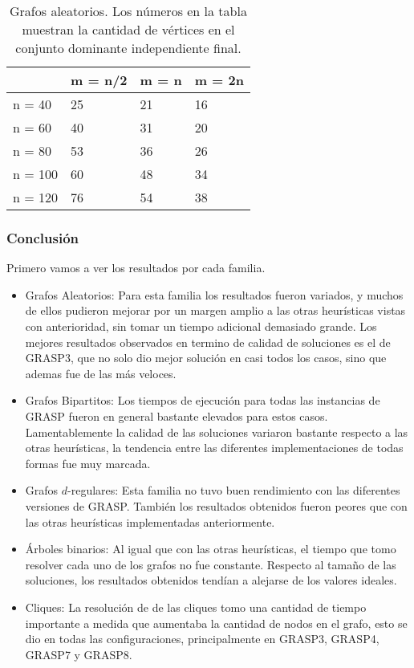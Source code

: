 \begin{table}[H]
\centering
\label{my-label}
\begin{tabular}{|l|lll|}
\hline
        & \multicolumn{1}{l|}{m = n/2} & \multicolumn{1}{l|}{m = n} & m = 2n \\ \hline
n = 40  & 25                           & 21                         & 16     \\ \cline{1-1}
n = 60  & 40                           & 31                         & 20     \\ \cline{1-1}
n = 80  & 53                           & 36                         & 26     \\ \cline{1-1}
n = 100 & 60                           & 48                         & 34     \\ \cline{1-1}
n = 120 & 76                           & 54                         & 38     \\ \hline
\end{tabular}
\caption{Grafos aleatorios. Los números en la tabla muestran la cantidad de vértices en el conjunto dominante independiente final.}
\end{table}

\subsubsection{Conclusión}

Primero vamos a ver los resultados por cada familia.

\begin{itemize}
	\item Grafos Aleatorios: Para esta familia los resultados fueron variados, y muchos de ellos pudieron mejorar por un margen amplio a las otras heurísticas vistas con anterioridad, sin tomar un tiempo adicional demasiado grande. Los mejores resultados observados en termino de calidad de soluciones es el de GRASP3, que no solo dio mejor solución en casi todos los casos, sino que ademas fue de las más veloces.	
	\item Grafos Bipartitos: Los tiempos de ejecución para todas las instancias de GRASP fueron en general bastante elevados para estos casos. Lamentablemente la calidad de las soluciones variaron bastante respecto a las otras heurísticas, la tendencia entre las diferentes implementaciones de todas formas fue muy marcada.
	\item Grafos $d$-regulares: Esta familia no tuvo buen rendimiento con las diferentes versiones de GRASP. También los resultados obtenidos fueron peores que con las otras heurísticas implementadas anteriormente.
	\item Árboles binarios: Al igual que con las otras heurísticas, el tiempo que tomo resolver cada uno de los grafos no fue constante. Respecto al tamaño de las soluciones, los resultados obtenidos tendían a alejarse de los valores ideales.
	\item Cliques: La resolución de de las cliques tomo una cantidad de tiempo importante a medida que aumentaba la cantidad de nodos en el grafo, esto se dio en todas las configuraciones, principalmente en GRASP3, GRASP4, GRASP7 y GRASP8.
\end{itemize}

